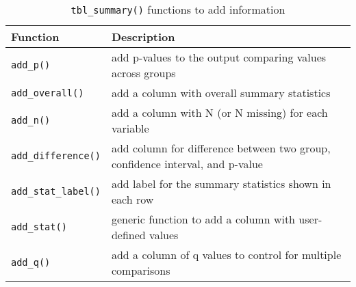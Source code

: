 \captionsetup[table]{labelformat=empty,skip=1pt}
\begin{longtable}{ll}
\caption{\label{tab:}\texttt{tbl\_summary()} functions to add information}\\
\toprule
Function & Description \\ 
\midrule
\texttt{add\_p()} & add p-values to the output comparing values across groups \\ 
\texttt{add\_overall()} & add a column with overall summary statistics \\ 
\texttt{add\_n()} & add a column with N (or N missing) for each variable \\ 
\texttt{add\_difference()} & add column for difference between two group, confidence interval, and p-value \\ 
\texttt{add\_stat\_label()} & add label for the summary statistics shown in each row \\ 
\texttt{add\_stat()} & generic function to add a column with user-defined values \\ 
\texttt{add\_q()} & add a column of q values to control for multiple comparisons \\ 
\bottomrule
\end{longtable}

